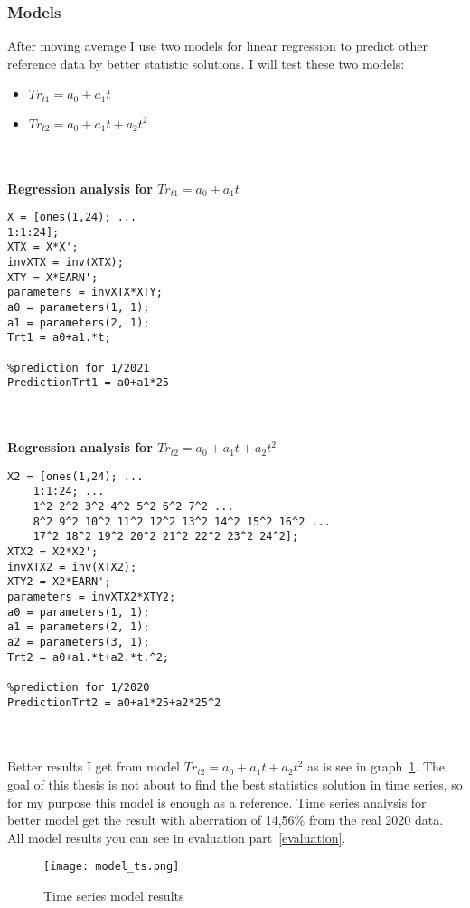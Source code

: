 \subsubsection{Models}
After moving average I use two models for linear regression to predict other reference data by better statistic solutions.
I will test these two models:
\begin{itemize}
    \item $Tr_{t1}=a_0+a_1t$
    \item $Tr_{t2}=a_0+a_1t+a_2t^2$
\end{itemize}\\
\\
\textbf{Regression analysis for $Tr_{t1}=a_0+a_1t$}\\
\begin{lstlisting}[language=mcode]
X = [ones(1,24); ...
1:1:24];
XTX = X*X';
invXTX = inv(XTX);
XTY = X*EARN';
parameters = invXTX*XTY;
a0 = parameters(1, 1);
a1 = parameters(2, 1);
Trt1 = a0+a1.*t;

%prediction for 1/2021
PredictionTrt1 = a0+a1*25
\end{lstlisting}\\
\\
\textbf{Regression analysis for $Tr_{t2}=a_0+a_1t+a_2t^2$}\\
\begin{lstlisting}[language=mcode]
X2 = [ones(1,24); ...
    1:1:24; ...
    1^2 2^2 3^2 4^2 5^2 6^2 7^2 ...
    8^2 9^2 10^2 11^2 12^2 13^2 14^2 15^2 16^2 ...
    17^2 18^2 19^2 20^2 21^2 22^2 23^2 24^2];
XTX2 = X2*X2';
invXTX2 = inv(XTX2);
XTY2 = X2*EARN';
parameters = invXTX2*XTY2;
a0 = parameters(1, 1);
a1 = parameters(2, 1);
a2 = parameters(3, 1);
Trt2 = a0+a1.*t+a2.*t.^2;

%prediction for 1/2020
PredictionTrt2 = a0+a1*25+a2*25^2
\end{lstlisting}\\
\\
Better results I get from model $Tr_{t2}=a_0+a_1t+a_2t^2$ as is see in graph~\ref{ts_models}.
The goal of this thesis is not about to find the best statistics solution in time series, so for my purpose this model is enough as a reference.
Time series analysis for better model get the result with aberration of 14,56\% from the real 2020 data.
All model results you can see in evaluation part~\ref{evaluation}.\\
\begin{figure}[h!]
    \begin{center}
        \texttt{[image: model\_ts.png]}
    \end{center}
    \caption{Time series model results}
    \label{ts_models}
\end{figure}
\newpage
